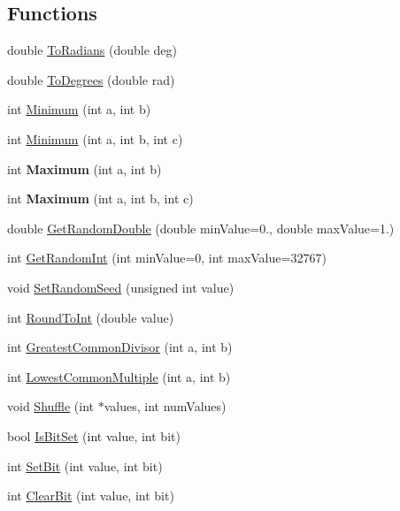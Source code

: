 \subsection*{Functions}
\begin{DoxyCompactItemize}
\item 
double \hyperlink{group__math__group_gafdd4eddaf6eadf34406a865e0cf6a30a}{To\+Radians} (double deg)
\item 
double \hyperlink{group__math__group_gab6efcc6e24e777db0fe5e0d0955c2b2d}{To\+Degrees} (double rad)
\item 
int \hyperlink{group__math__group_ga3b74a8d5a155a56580ecd5617cacb4b1}{Minimum} (int a, int b)
\item 
int \hyperlink{group__math__group_gac4c560cadf6af2e052f767eb02d982c0}{Minimum} (int a, int b, int c)
\item 
\mbox{\label{group__math__group_ga9afd8a6d559a06465541ce2c6f99fc1d}} 
int {\bfseries Maximum} (int a, int b)
\item 
\mbox{\label{group__math__group_ga4c9a564a95fdd10c4ac6998afe8e3743}} 
int {\bfseries Maximum} (int a, int b, int c)
\item 
double \hyperlink{group__math__group_ga298f9ccec14d3ea06c05ccd1e1e062ac}{Get\+Random\+Double} (double min\+Value=0., double max\+Value=1.)
\item 
int \hyperlink{group__math__group_gab82c25b1da5feec79806fe080becf2c3}{Get\+Random\+Int} (int min\+Value=0, int max\+Value=32767)
\item 
void \hyperlink{group__math__group_gab62eb7c4d19d31b0e0ac5f89a126b199}{Set\+Random\+Seed} (unsigned int value)
\item 
int \hyperlink{group__math__group_ga06bd02ff0de83d2713683574ac288fb3}{Round\+To\+Int} (double value)
\item 
int \hyperlink{group__math__group_gaaf5732ddb11cda2a05f0f978265a114e}{Greatest\+Common\+Divisor} (int a, int b)
\item 
int \hyperlink{group__math__group_ga322fe1f4e7738ff3234fe70d04daeafe}{Lowest\+Common\+Multiple} (int a, int b)
\item 
void \hyperlink{group__math__group_ga9dffb844db4ac8823c6c957448576ed8}{Shuffle} (int $\ast$values, int num\+Values)
\item 
bool \hyperlink{group__math__group_ga1fbbb8c0c7c30db6995b5a4fa82e1754}{Is\+Bit\+Set} (int value, int bit)
\item 
int \hyperlink{group__math__group_ga8c8748fbb1d3e99db79f20fc17d4e63b}{Set\+Bit} (int value, int bit)
\item 
int \hyperlink{group__math__group_ga4ce9c5e2cee3bf609fcfba01c0f8e6a7}{Clear\+Bit} (int value, int bit)
\end{DoxyCompactItemize}


